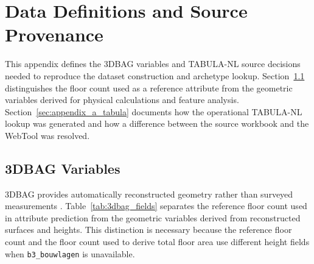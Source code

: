 \chapter{Data Definitions and Source Provenance}
\label{ch:appendix_a}

This appendix defines the 3DBAG variables and TABULA-NL source decisions needed to reproduce the dataset construction and archetype lookup.
Section~\ref{sec:appendix_a_3dbag} distinguishes the floor count used as a reference attribute from the geometric variables derived for physical calculations and feature analysis.
Section~\ref{sec:appendix_a_tabula} documents how the operational TABULA-NL lookup was generated and how a difference between the source workbook and the WebTool was resolved.

\section{3DBAG Variables}
\label{sec:appendix_a_3dbag}

3DBAG provides automatically reconstructed geometry rather than surveyed measurements \parencite{threedbagdocs,peters2022,dukai2021}.
Table~\ref{tab:3dbag_fields} separates the reference floor count used in attribute prediction from the geometric variables derived from reconstructed surfaces and heights.
This distinction is necessary because the reference floor count and the floor count used to derive total floor area use different height fields when \texttt{b3\_bouwlagen} is unavailable.

